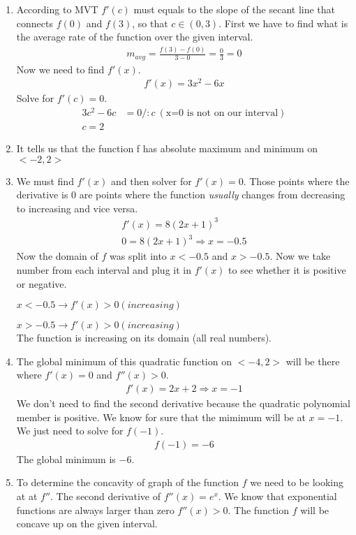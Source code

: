 \documentclass[13pt, a4paper, twoside]{article}
\begin{document}
\begin{enumerate}
\large \onehalfspacing
\item According to MVT $f'(c)$ must equals to the slope of the secant line that
connects $f(0)$ and $f(3)$, so that $c \in (0, 3)$.
First we have to find what is the average rate of the function over the given interval.
    \begin{align*}
        m_{avg} = \frac{f(3)-f(0)}{3-0} = \frac{0}{3} = 0
    \end{align*}
Now we need to find $f'(x)$.
    \begin{align*}
        f'(x) = 3x^2 - 6x
    \end{align*}
Solve for $f'(c)=0$.
    \begin{align*}
        3c^2 - 6c &= 0 /:c \:(\text{x=0 is not on our interval})\\
        c = 2
    \end{align*}
\item It tells us that the function f has absolute maximum and minimum on $<-2,2>$

\item  We must find $f'(x)$ and then solver for $f'(x)=0$. Those points where the 
derivative is 0 are points where the function \emph{usually} changes from decreasing
to increasing and vice versa.
\begin{align*}
    f'(x) = 8(2x+1)^3\\
    0 = 8(2x+1)^3 \Rightarrow x=-0.5
\end{align*}
Now the domain of $f$ was split into $x<-0.5$ and $x>-0.5$. Now we take number
from each interval and plug it in $f'(x)$ to see whether it is positive or negative.

$x<-0.5 \to f'(x)>0 (increasing)$

$x>-0.5 \to f'(x)>0 (increasing)$\\
The function is increasing on its domain (all real numbers).
\item The global minimum of this quadratic function on $<-4,2>$ will be there
where $f'(x)=0$ and $f''(x)>0$.
\begin{align*}
    f'(x)=2x + 2 \Rightarrow x=-1
\end{align*}
We don't need to find the second derivative because the quadratic polynomial member
is positive. We know for sure that the mimimum will be at $x=-1$. We just need
to solve for $f(-1)$.
\begin{align*}
    f(-1) = -6
\end{align*}
The global minimum is $-6$.
\item To determine the concavity of graph of the function $f$ we need to be looking at
at $f''$. The second derivative of $f''(x)=e^x$. We know that exponential functions are
always larger than zero $f''(x)>0$. The function $f$ will be concave up on the given interval.


\end{enumerate}
\end{document}
